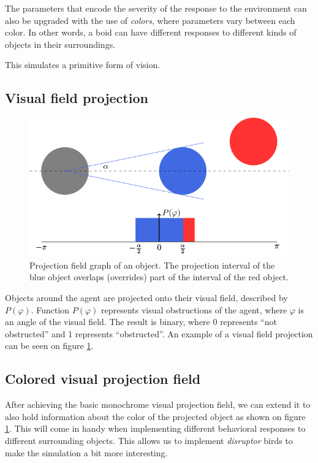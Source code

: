 \documentclass[9pt]{pnas-new}
\begin{document}
The parameters that encode the severity of the response to the environment can also be upgraded with the use of \textit{colors}, where parameters vary between each color.
In other words, a boid can have different responses to different kinds of objects in their surroundings.

This simulates a primitive form of vision.





\subsection{Visual field projection}

\begin{figure}
    \centering
    \includegraphics[width=0.7\linewidth]{figures/projection-colored.pdf}
    \caption{
       Projection field graph of an object. The projection interval of the blue object overlaps (overrides) part of the interval of the red object.
    }
    \label{fig:example-projection}
\end{figure}

\sloppy

Objects around the agent are projected onto their visual field, described by $P(\varphi)$.
Function $P(\varphi)$ represents visual obstructions of the agent, where $\varphi$ is an angle of the visual field. The result is binary, where 0 represents ``not obstructed'' and 1 represents ``obstructed''.
An example of a visual field projection can be seen on figure \ref{fig:example-projection}.

\fussy


\subsection{Colored visual projection field}

After achieving the basic monochrome visual projection field, we can extend it to also hold information about the color of the projected object as shown on figure \ref{fig:example-projection}.
This will come in handy when implementing different behavioral responses to different surrounding objects.
This allows us to implement \textit{disruptor} birds to make the simulation a bit more interesting.
\end{document}
